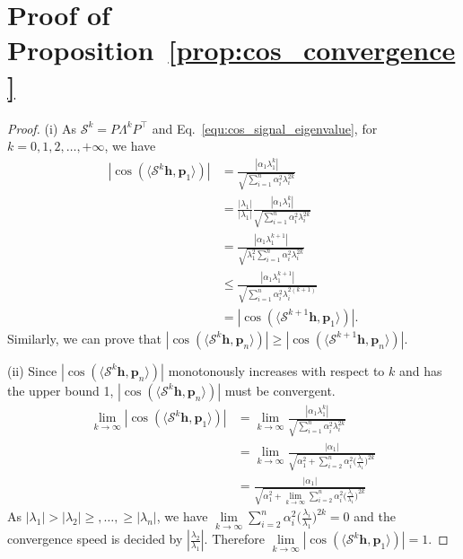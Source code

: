 \documentclass[nohyperref]{article}
\theoremstyle{plain}
\theoremstyle{definition}
\theoremstyle{remark}
\begin{document}
\section{Proof of Proposition~\ref{prop:cos_convergence}}
\label{proof:prop:cos_convergence}

\begin{proof}
	(i)
	As $ \mathcal S^k= P\Lambda^k P^{\top}$ and Eq.~\ref{equ:cos_signal_eigenvalue}, for $k=0,1,2,\dots,+\infty$, we have
	\begin{equation}
		\nonumber
		\begin{aligned}
			|\cos(\langle \mathcal S^k\bm h, \bm p_1\rangle)|&=\frac{|\alpha_1\lambda_1^k|}{\sqrt{\sum^n_{i=1}\alpha_i^2\lambda_i^{2k}}}\\
			&=\frac{|\lambda_1|}{|\lambda_1|} \frac{|\alpha_1\lambda_1^k|}{\sqrt{\sum^n_{i=1}\alpha_i^2\lambda_i^{2k}}}\\
			&=\frac{|\alpha_1\lambda_1^{k+1}|}{\sqrt{\lambda_1^2\sum^n_{i=1}\alpha_i^2\lambda_i^{2k}}}\\
			&\leq\frac{|\alpha_1\lambda_1^{k+1}|}{\sqrt{\sum^n_{i=1}\alpha_i^2\lambda_i^{2(k+1)}}}\\
			&=|\cos(\langle \mathcal S^{k+1}\bm h, \bm p_1\rangle)|.
		\end{aligned}
	\end{equation}
	Similarly, we can prove that $|\cos(\langle \mathcal S^k\bm h, \bm p_n\rangle)|\geq |\cos(\langle \mathcal S^{k+1}\bm h, \bm p_n\rangle)|$.
	
	(ii)
	Since $|\cos(\langle \mathcal S^k\bm h, \bm p_n\rangle)|$ monotonously increases with respect to $k$ and has the upper bound 1, $|\cos(\langle \mathcal S^k\bm h, \bm p_n\rangle)|$ must be convergent.
	\begin{equation}
		\nonumber
		\begin{aligned}
			\lim\limits_{k\rightarrow\infty}|\cos(\langle \mathcal S^k\bm h, \bm p_1\rangle)|&=\lim\limits_{k\rightarrow\infty}\frac{|\alpha_1\lambda_1^k|}{\sqrt{\sum^n_{i=1}\alpha_i^2\lambda_i^{2k}}}\\
			&=\lim\limits_{k\rightarrow\infty}\frac{|\alpha_1|}{\sqrt{\alpha_1^2+\sum^n_{i=2}\alpha_i^2\bigl(\frac{\lambda_i}{\lambda_1}\bigr)^{2k}}}\\
			&=\frac{|\alpha_1|}{\sqrt{\alpha_1^2+\lim\limits_{k\rightarrow\infty}\sum^n_{i=2}\alpha_i^2\bigl(\frac{\lambda_i}{\lambda_1}\bigr)^{2k}}}
		\end{aligned}
	\end{equation}
	As $|\lambda_1|>|\lambda_2|\geq,\dots,\geq|\lambda_n|$, we have $\lim\limits_{k\rightarrow\infty}\sum^n_{i=2}\alpha_i^2\bigl(\frac{\lambda_i}{\lambda_1}\bigr)^{2k}=0$ and the convergence speed is decided by $|\frac{\lambda_2}{\lambda_1}|$.
	Therefore $\lim\limits_{k\rightarrow\infty}|\cos(\langle \mathcal S^k\bm h, \bm p_1\rangle)|=1$.
	

\end{proof}
\end{document}
